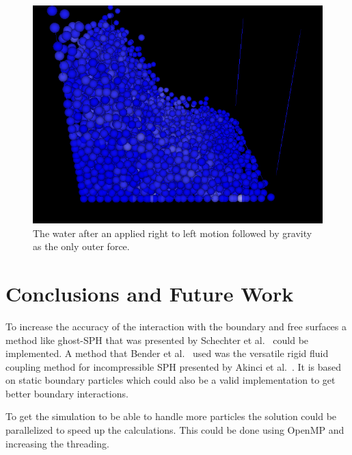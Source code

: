 	\begin{figure}[h!]
		\includegraphics[width=\linewidth]{img/frame0882.png}
		\caption{The water after an applied right to left motion followed by gravity as the only outer force.}
		\label{fig:res4}
	\end{figure}



\section{Conclusions and Future Work}

    To increase the accuracy of the interaction with the boundary and free surfaces a method like ghost-SPH that was presented by Schechter et al.~\cite{ghost} could be implemented.
    A method that Bender et al.~\cite{bender} used was the versatile rigid fluid coupling method for incompressible SPH presented by Akinci et al.~\cite{akinci2012versatile}.
    It is based on static boundary particles which could also be a valid implementation to get better boundary interactions.

    To get the simulation to be able to handle more particles the solution could be parallelized to speed up the calculations.
    This could be done using OpenMP and increasing the threading.

